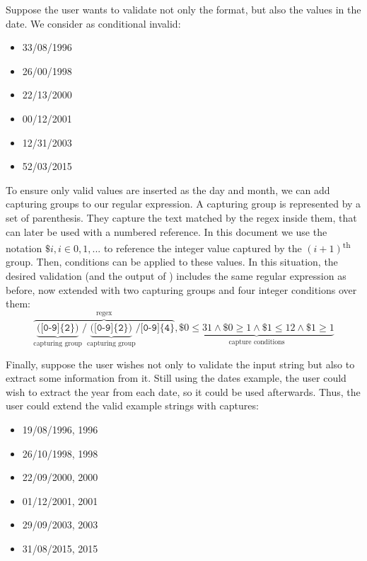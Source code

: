 Suppose the user wants to validate not only the format, but also the values in the date.
We consider as conditional invalid:
\begin{multicols}{3}
    \begin{itemize}[label={}]
    \item 33/08/1996
    \item 26/00/1998
    \item 22/13/2000
    \item 00/12/2001
    \item 12/31/2003
    \item 52/03/2015
    \end{itemize}
\end{multicols}
To ensure only valid values are inserted as the day and month, we can add capturing groups to our regular expression.
A capturing group is represented by a set of parenthesis.
They capture the text matched by the regex inside them, that can later be used with a numbered reference. In this document we use the notation \(\$i, i \in 0, 1, ...\) to reference the integer value captured by the \((i+1)\)\textsuperscript{th} group.
Then, conditions can be applied to these values. In this situation, the desired validation (and the output of \Forest) includes the same regular expression as before, now extended with two capturing groups and four integer conditions over them:
%
\[
\overbrace{\underbrace{\texttt{([0-9]\{2\})}}_\textrm{capturing group}\texttt{/}\underbrace{\texttt{([0-9]\{2\})}}_\textrm{capturing group}\texttt{/[0-9]\{4\}}}^\textrm{regex},
\underbrace{\$0 \le 31 \wedge \$0 \ge 1 \wedge \$1 \le 12 \wedge \$1 \ge 1}_\textrm{capture conditions}
\]

Finally, suppose the user wishes not only to validate the input string but also to extract some information from it. Still using the dates example, the user could wish to extract the year from each date, so it could be used afterwards. Thus, the user could extend the valid example strings with captures:
\begin{multicols}{3}
    \begin{itemize}[label={}]
    \item 19/08/1996, 1996
    \item 26/10/1998, 1998
    \item 22/09/2000, 2000
    \item 01/12/2001, 2001
    \item 29/09/2003, 2003
    \item 31/08/2015, 2015
    \end{itemize}
\end{multicols}

